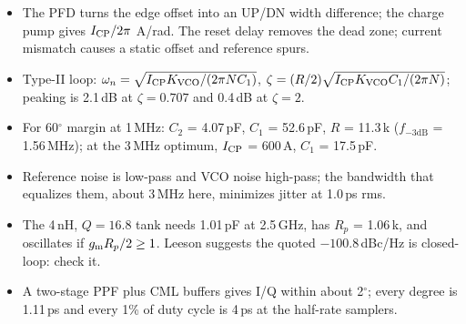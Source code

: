 \begin{takeaways}
\begin{itemize}
  \item The PFD turns the edge offset into an UP/DN width difference; the charge pump gives $I_\mathrm{CP}/2\pi$ A/rad. The reset delay removes the dead zone; current mismatch causes a static offset and reference spurs.
  \item Type-II loop: $\omega_n = \sqrt{I_\mathrm{CP}K_\mathrm{VCO}/(2\pi NC_1)}$, $\zeta = (R/2)\sqrt{I_\mathrm{CP}K_\mathrm{VCO} C_1/(2\pi N)}$; peaking is 2.1\,dB at $\zeta = 0.707$ and 0.4\,dB at $\zeta = 2$.
  \item For 60$^\circ$ margin at 1\,MHz: $C_2$ = 4.07\,pF, $C_1$ = 52.6\,pF, $R$ = 11.3\,k\Ohm{} ($f_{-3\mathrm{dB}}$ = 1.56\,MHz); at the 3\,MHz optimum, $I_\mathrm{CP}$ = 600\,\textmu{}A, $C_1$ = 17.5\,pF.
  \item Reference noise is low-pass and VCO noise high-pass; the bandwidth that equalizes them, about 3\,MHz here, minimizes jitter at 1.0\,ps rms.
  \item The 4\,nH, $Q = 16.8$ tank needs 1.01\,pF at 2.5\,GHz, has $R_p$ = 1.06\,k\Ohm{}, and oscillates if $g_\mathrm{m} R_p/2 \ge 1$. Leeson suggests the quoted $-100.8$\,dBc/Hz is closed-loop: check it.
  \item A two-stage PPF plus CML buffers gives I/Q within about 2$^\circ$; every degree is 1.11\,ps and every 1\% of duty cycle is 4\,ps at the half-rate samplers.
\end{itemize}
\end{takeaways}
